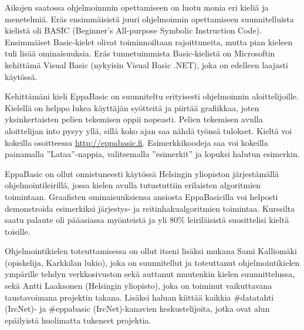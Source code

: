 Aikojen saatossa ohjelmoinnnin opettamiseen
on luotu monia eri kieliä ja menetelmiä.
Eräs ensimmäisistä juuri ohjelmoinnin opettamiseen
suunnitelluista kielistä oli BASIC
(Beginner's All-purpose Symbolic Instruction Code).
Ensimmäiset Basic-kielet olivat toiminnoiltaan rajoittuneita,
mutta pian kieleen tuli lisää ominaisuuksia.
Eräs tunnetuimmista Basic-kielistä on
Microsoftin kehittämä Visual Basic
(nykyisin Visual Basic .NET),
joka on edelleen laajasti käytössä.

Kehittämäni kieli EppaBasic on suunniteltu
erityisesti ohjelmoinnin aloittelijoille.
Kielellä on helppo lukea käyttäjän syötteitä
ja piirtää grafiikkaa,
joten yksinkertaisten pelien tekemisen oppii nopeasti.
Pelien tekemisen avulla aloittelijan into pysyy yllä,
sillä koko ajan saa nähdä työnsä tulokset.
Kieltä voi kokeilla osoitteessa
\url{http://eppabasic.fi}.
Esimerkkikoodeja saa voi kokeilla painamalla
''Lataa''-nappia, valitsemalla ''esimerkit''
ja lopuksi halutun esimerkin.

EppaBasic on ollut onnistuneesti käytössä
Helsingin yliopiston järjestämällä ohjelmointileirillä,
jossa kielen avulla tutustuttiin erilaisten algoritmien toimintaan.
Graafisten ominaisuuksiensa ansiosta
EppaBasicilla voi helposti demonstroida
esimerkiksi järjestys- ja reitinhakualgoritmien toimintaa.
Kurssilta saatu palaute oli pääasiassa myönteistä
ja yli 80\% leiriläisistä suosittelisi kieltä toisille.

Ohjelmointikielen toteuttamisessa on ollut itseni lisäksi mukana
Sami Kalliomäki (opiskelija, Karkkilan lukio),
joka on suunnitellut ja toteuttanut ohjelmointikielen ympärille tehdyn verkkosivuston
sekä auttanut muutenkin kielen suunnittelussa,
sekä Antti Laaksonen (Helsingin yliopisto),
joka on toiminut vaikuttavana taustavoimana projektin takana.
Lisäksi haluan kiittää kaikkia \#datatahti (IrcNet)- ja \#eppabasic (IrcNet)-kanavien keskustelijoita,
jotka ovat alun epäilyistä huolimatta tukeneet projektia.


%
